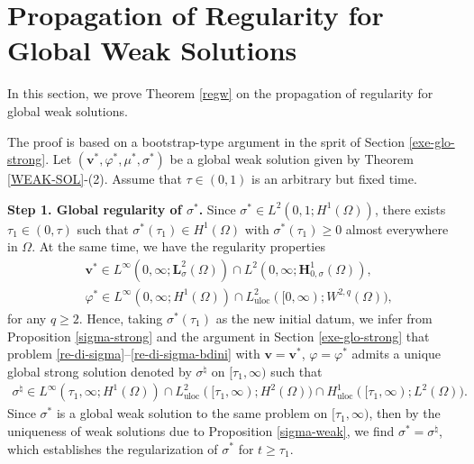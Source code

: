 \documentclass[11pt,reqno]{amsart}
\def\H{\bm{H}}
\def\L{\bm{L}}
\def\vv{\bm{v}}
\begin{document}
\section{Propagation of Regularity for Global Weak Solutions}
\label{Propa-reg}
\setcounter{equation}{0}

%
In this section, we prove Theorem \ref{regw} on the propagation of regularity for global weak solutions.

The proof is based on a bootstrap-type argument in the sprit of Section \ref{exe-glo-strong}. Let $(\vv^*, \varphi^*,\mu^*,\sigma^*)$ be a global weak solution given by Theorem \ref{WEAK-SOL}-(2). Assume that $\tau\in (0,1)$ is an arbitrary but fixed time.
\smallskip

\textbf{Step 1. Global regularity of $\sigma^*$.}
Since $\sigma^* \in  L^2(0,1; H^1(\Omega))$, there exists $\tau_1\in(0,\tau)$ such that $\sigma^*(\tau_1) \in H^1(\Omega)$ with $\sigma^*(\tau_1)\geq 0$ almost everywhere in $\Omega$. At the same time, we have the regularity properties
%
\begin{align*}
&\vv^* \in L^{\infty}(0,\infty;\L^2_{\sigma}(\Omega))\cap L^2(0,\infty;\H^1_{0,\sigma}(\Omega)),
\\
&\varphi^* \in L^\infty(0,\infty;H^1(\Omega))\cap L^2_{\mathrm{uloc}}([0,\infty);W^{2,q}(\Omega)),
\end{align*}
%
for any $q\geq 2$.
Hence, taking $\sigma^*(\tau_1)$ as the new initial datum, we infer from Proposition \ref{sigma-strong} and the argument in Section \ref{exe-glo-strong} that problem
\eqref{re-di-sigma}--\eqref{re-di-sigma-bdini} with $\vv=\vv^*$, $\varphi=\varphi^*$ admits a unique global strong solution denoted by $\sigma^\natural$ on $[\tau_1,\infty)$ such that
%
\begin{equation}
\label{REG1-b}
\begin{split}
\sigma^\natural \in L^{\infty}(\tau_1,\infty;H^1(\Omega)) \cap L^2_{\mathrm{uloc}}([\tau_1,\infty); H^2(\Omega))\cap H^1_{\mathrm{uloc}}([\tau_1,\infty);L^2(\Omega)).
\end{split}
\end{equation}
%
Since $\sigma^*$ is a global weak solution to the same problem on $[\tau_1,\infty)$, then by the uniqueness of weak solutions due to Proposition \ref{sigma-weak}, we find $\sigma^*=\sigma^\natural$, which establishes the regularization of $\sigma^*$ for $t\geq \tau_1$.
\smallskip
\end{document}
